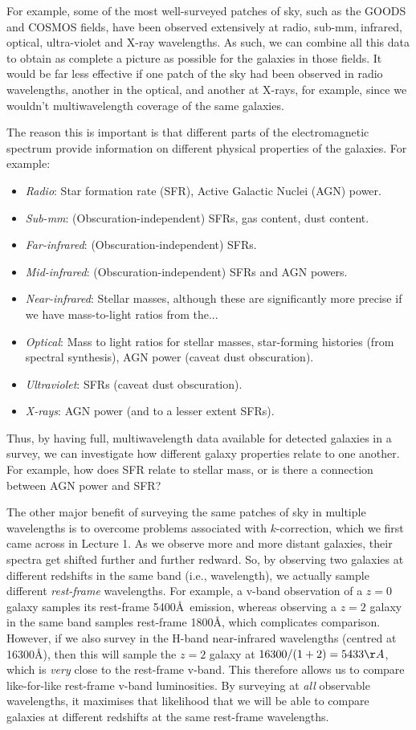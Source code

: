 \documentclass[11pt]{article}
\begin{document}
For example, some of the most well-surveyed patches of sky, such as
the GOODS and COSMOS fields, have been observed extensively at radio,
sub-mm, infrared, optical, ultra-violet and X-ray wavelengths. As
such, we can combine all this data to obtain as complete a picture as
possible for the galaxies in those fields. It would be far less
effective if one patch of the sky had been observed in radio
wavelengths, another in the optical, and another at X-rays, for
example, since we wouldn't multiwavelength coverage of the same
galaxies.

The reason this is important is that different parts of the
electromagnetic spectrum provide information on different physical
properties of the galaxies. For example:
\begin{itemize}
\item {\it Radio}: Star formation rate (SFR), Active Galactic Nuclei
  (AGN) power.
\item {\it Sub-mm}: (Obscuration-independent) SFRs, gas content, dust
  content.
\item {\it Far-infrared}: (Obscuration-independent) SFRs.
\item {\it Mid-infrared}: (Obscuration-independent) SFRs and AGN powers.
\item {\it Near-infrared}: Stellar masses, although these are
  significantly more precise if we have mass-to-light ratios from the...
\item {\it Optical}: Mass to light ratios for stellar masses,
  star-forming histories (from spectral synthesis), AGN power (caveat
  dust obscuration).
\item {\it Ultraviolet}: SFRs (caveat dust obscuration).
\item {\it X-rays}: AGN power (and to a lesser extent SFRs).
\end{itemize}
Thus, by having full, multiwavelength data available for detected
galaxies in a survey, we can investigate how different galaxy properties
relate to one another. For example, how does SFR relate to stellar
mass, or is there a connection between AGN power and SFR?

The other major benefit of surveying the same patches of sky in
multiple wavelengths is to overcome problems associated with
$k$-correction, which we first came across in Lecture 1. As we observe
more and more distant galaxies, their spectra get shifted further and
further redward. So, by observing two galaxies at different redshifts
in the same band (i.e., wavelength), we actually sample different {\it
  rest-frame} wavelengths. For example, a v-band observation of a
$z=0$ galaxy samples its rest-frame 5400\AA\ emission, whereas
observing a $z=2$ galaxy in the same band samples rest-frame 1800\AA ,
which complicates comparison. However, if we also survey in the H-band
near-infrared wavelengths (centred at 16300\AA ), then this will sample
the $z=2$ galaxy at $16300/(1+2)=5433\AA$, which is {\it very} close
to the rest-frame v-band. This therefore allows us to compare
like-for-like rest-frame v-band luminosities. By surveying at {\it
  all} observable wavelengths, it maximises that likelihood that we
will be able to compare galaxies at different redshifts at the same
rest-frame wavelengths.
\end{document}
